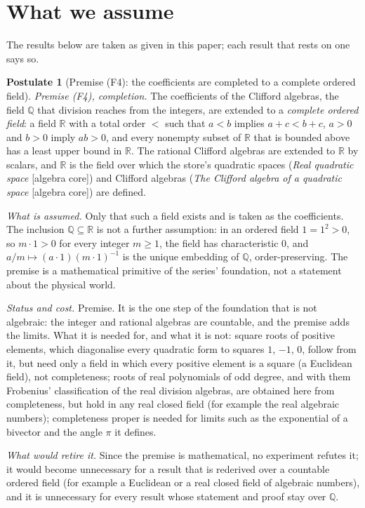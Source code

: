 \documentclass[11pt]{article}
\theoremstyle{definition}
\newtheorem{postulate}[theorem]{Postulate}
\theoremstyle{plain}
\newcommand{\changedmark}[2]{\marginpar{\raggedright\scriptsize\color{#1}#2}}
\providecommand{\Q}{}\renewcommand{\Q}{\mathbb{Q}}
\providecommand{\R}{}\renewcommand{\R}{\mathbb{R}}
\begin{document}
\section*{What we assume}
The results below are taken as given in this paper; each result that rests on one says so.
\begin{postulate}[Premise (F4): the coefficients are completed to a complete ordered field]\label{c:synthesis.continuum-completion-premise}
\changedmark{BurntOrange}{changed since the deposit}
\emph{Premise (F4), completion.} The coefficients of the Clifford algebras, the field $\Q$ that division reaches from the integers, are extended to a \emph{complete ordered field}: a field $\R$ with a total order $<$ such that $a < b$ implies $a + c < b + c$, $a > 0$ and $b > 0$ imply $ab > 0$, and every nonempty subset of $\R$ that is bounded above has a least upper bound in $\R$. The rational Clifford algebras are extended to $\R$ by scalars, and $\R$ is the field over which the store's quadratic spaces (\emph{Real quadratic space} [algebra core]) and Clifford algebras (\emph{The Clifford algebra of a quadratic space} [algebra core]) are defined.

\emph{What is assumed.} Only that such a field exists and is taken as the coefficients. The inclusion $\Q \subseteq \R$ is not a further assumption: in an ordered field $1 = 1^{2} > 0$, so $m \cdot 1 > 0$ for every integer $m \ge 1$, the field has characteristic $0$, and $a/m \mapsto (a \cdot 1)(m \cdot 1)^{-1}$ is the unique embedding of $\Q$, order-preserving. The premise is a mathematical primitive of the series' foundation, not a statement about the physical world.

\emph{Status and cost.} Premise. It is the one step of the foundation that is not algebraic: the integer and rational algebras are countable, and the premise adds the limits. What it is needed for, and what it is not: square roots of positive elements, which diagonalise every quadratic form to squares $1$, $-1$, $0$, follow from it, but need only a field in which every positive element is a square (a Euclidean field), not completeness; roots of real polynomials of odd degree, and with them Frobenius' classification of the real division algebras, are obtained here from completeness, but hold in any real closed field (for example the real algebraic numbers); completeness proper is needed for limits such as the exponential of a bivector and the angle $\pi$ it defines.

\emph{What would retire it.} Since the premise is mathematical, no experiment refutes it; it would become unnecessary for a result that is rederived over a countable ordered field (for example a Euclidean or a real closed field of algebraic numbers), and it is unnecessary for every result whose statement and proof stay over $\Q$.
\end{postulate}
\end{document}
